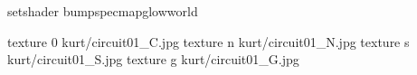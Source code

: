 setshader bumpspecmapglowworld

texture 0 kurt/circuit01_C.jpg
texture n kurt/circuit01_N.jpg
texture s kurt/circuit01_S.jpg
texture g kurt/circuit01_G.jpg

